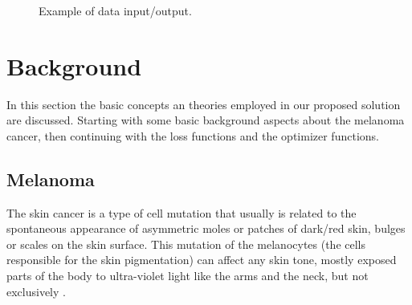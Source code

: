 \begin{figure}[h]
  \centering
  \qquad
  \caption{Example of data input/output.}
\end{figure}


\section{Background}
In this section the basic concepts an theories employed in our proposed solution are discussed. Starting with some basic background aspects about the melanoma cancer, then continuing with the loss functions and the optimizer functions.

\subsection{Melanoma}
The skin cancer is a type of cell mutation that usually is related to the spontaneous appearance of asymmetric moles or patches of dark/red skin, bulges or scales on the skin surface. This mutation of the melanocytes (the cells responsible for the skin pigmentation) can affect any skin tone, mostly exposed parts of the body to ultra-violet light like the arms and the neck, but not exclusively \citep{boni2002epidemiology}.

